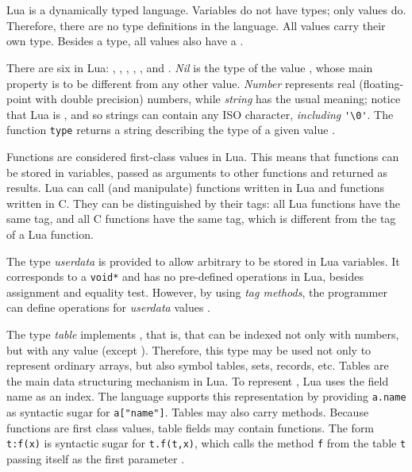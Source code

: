 \section{} \label{TypesSec}

Lua is a dynamically typed language.
Variables do not have types; only values do.
Therefore, there are no type definitions in the language.
All values carry their own type.
Besides a type, all values also have a .

There are six  in Lua: , ,
, , , and .
\emph{Nil} is the type of the value \nil,
whose main property is to be different from any other value.
\emph{Number} represents real (floating-point with double precision) numbers,
while \emph{string} has the usual meaning;
notice that Lua is ,
and so strings can contain any ISO character,
\emph{including} \verb|'\0'|.
The function \verb|type| returns a string describing the type
of a given value .

Functions are considered first-class values in Lua.
This means that functions can be stored in variables,
passed as arguments to other functions and returned as results.
Lua can call (and manipulate) functions written in Lua and
functions written in C.
They can be distinguished by their tags:
all Lua functions have the same tag,
and all C functions have the same tag,
which is different from the tag of a Lua function.

The type \emph{userdata} is provided to allow
arbitrary  to be stored in Lua variables.
It corresponds to a \verb|void*| and has no pre-defined operations in Lua,
besides assignment and equality test.
However, by using \emph{tag methods},
the programmer can define operations for \emph{userdata} values
.

The type \emph{table} implements ,
that is,  that can be indexed not only with numbers,
but with any value (except \nil).
Therefore, this type may be used not only to represent ordinary arrays,
but also symbol tables, sets, records, etc.
Tables are the main data structuring mechanism in Lua.
To represent , Lua uses the field name as an index.
The language supports this representation by
providing \verb|a.name| as syntactic sugar for \verb|a["name"]|.
Tables may also carry methods.
Because functions are first class values,
table fields may contain functions.
The form \verb|t:f(x)| is syntactic sugar for \verb|t.f(t,x)|,
which calls the method \verb|f| from the table \verb|t| passing
itself as the first parameter .

